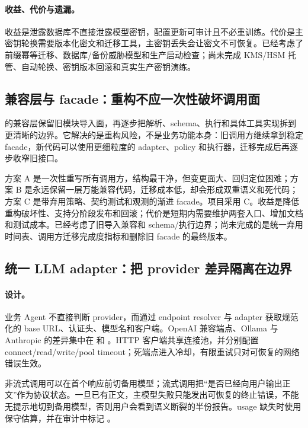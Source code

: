 \paragraph{收益、代价与遗漏。}
收益是泄露数据库不直接泄露模型密钥，配置更新可审计且不必重训练。代价是主密钥轮换需要版本化密文和迁移工具，主密钥丢失会让密文不可恢复。已经考虑了前缀幂等迁移、数据库/备份威胁模型和生产启动检查；尚未完成 KMS/HSM 托管、自动轮换、密钥版本回滚和真实生产密钥演练。

\subsection{兼容层与 facade：重构不应一次性破坏调用面}

 的兼容层保留旧模块导入面，再逐步把解析、schema、执行和具体工具实现拆到更清晰的边界。它解决的是重构风险，不是业务功能本身：旧调用方继续拿到稳定 facade，新代码可以使用更细粒度的 adapter、policy 和执行器，迁移完成后再逐步收窄旧接口。

方案 A 是一次性重写所有调用方，结构最干净，但变更面大、回归定位困难；方案 B 是永远保留一层万能兼容代码，迁移成本低，却会形成双重语义和死代码；方案 C 是带弃用策略、契约测试和观测的渐进 facade。项目采用 C。收益是降低重构破坏性、支持分阶段发布和回滚；代价是短期内需要维护两套入口、增加文档和测试成本。已经考虑了旧导入兼容和 schema/执行边界；尚未完成的是统一弃用时间表、调用方迁移完成度指标和删除旧 facade 的最终版本。

\subsection{统一 LLM adapter：把 provider 差异隔离在边界}

\paragraph{设计。}
业务 Agent 不直接判断 provider，而通过 endpoint resolver 与 adapter 获取规范化的 base URL、认证头、模型名和客户端。OpenAI 兼容端点、Ollama 与 Anthropic 的差异集中在  和 。HTTP 客户端共享连接池，并分别配置 connect/read/write/pool timeout；死端点进入冷却，有限重试只对可恢复的网络错误生效。

非流式调用可以在首个响应前切备用模型；流式调用把“是否已经向用户输出正文”作为协议状态。一旦已有正文，主模型失败只能发出可恢复的终止错误，不能无提示地切到备用模型，否则用户会看到语义断裂的半份报告。usage 缺失时使用保守估算，并在审计中标记 。


